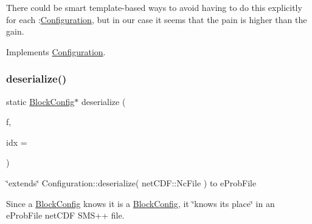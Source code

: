 There could be smart template-\/based ways to avoid having to do this explicitly for each \+:\mbox{\hyperlink{class_s_m_spp__di__unipi__it_1_1_configuration}{Configuration}}, but in our case it seems that the pain is higher than the gain. 

Implements \mbox{\hyperlink{class_s_m_spp__di__unipi__it_1_1_configuration_aa982da3f095d1a857dc95d53ac335700}{Configuration}}.

\mbox{\label{class_s_m_spp__di__unipi__it_1_1_block_config_a9fd3061a0f53bf1121551e9fffd4b202}} 
\subsubsection{\texorpdfstring{deserialize()}{deserialize()}\hspace{0.1cm}{\footnotesize\ttfamily [1/2]}}
{\footnotesize\ttfamily static \mbox{\hyperlink{class_s_m_spp__di__unipi__it_1_1_block_config}{Block\+Config}}$\ast$ deserialize (\begin{DoxyParamCaption}\item[{net\+C\+D\+F\+::\+Nc\+File \&\&}]{f,  }\item[{const unsigned int}]{idx = {} }\end{DoxyParamCaption})\hspace{0.3cm}{\ttfamily [static]}}



\char`\"{}extends\char`\"{} Configuration\+::deserialize( net\+C\+D\+F\+::\+Nc\+File ) to e\+Prob\+File 

Since a \mbox{\hyperlink{class_s_m_spp__di__unipi__it_1_1_block_config}{Block\+Config}} knows it is a \mbox{\hyperlink{class_s_m_spp__di__unipi__it_1_1_block_config}{Block\+Config}}, it \char`\"{}knows its place\char`\"{} in an e\+Prob\+File net\+C\+DF S\+M\+S++ file. \mbox{\label{class_s_m_spp__di__unipi__it_1_1_block_config_a828ece608e8a4a497f43d3d6bb75af40}} 
